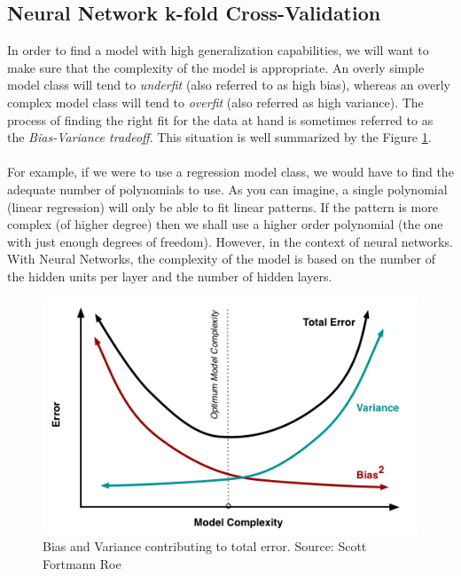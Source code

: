 \documentclass[a4paper,12pt, oneside]{memoir}
\begin{document}
\subsection{Neural Network k-fold Cross-Validation}
In order to find a model with high generalization capabilities, we will want to make sure that the complexity of the model is appropriate. An overly simple model class will tend to \textit{underfit} (also referred to as high bias), whereas an overly complex model class will tend to \textit{overfit} (also referred as high variance). The process of finding the right fit for the data at hand is sometimes referred to as the \textit{Bias-Variance tradeoff}. This situation is well summarized by the Figure \ref{bias-variance-tradeoff}.
\\ \\
For example, if we were to use a regression model class, we would have to find the adequate number of polynomials to use. As you can imagine, a single polynomial (linear regression) will only be able to fit linear patterns. If the pattern is more complex (of higher degree) then we shall use a higher order polynomial (the one with just enough degrees of freedom). However, in the context of neural networks. With Neural Networks, the complexity of the model is based on the number of the hidden units per layer and the number of hidden layers.

\begin{figure}[!h]
  \begin{center}
    \includegraphics[scale=0.65]{biasvariance_fortmann_roe}
  \end{center}
  \caption{Bias and Variance contributing to total error. Source: Scott Fortmann Roe\cite{fortmann-2012}}
  \label{bias-variance-tradeoff}
\end{figure}
\end{document}
